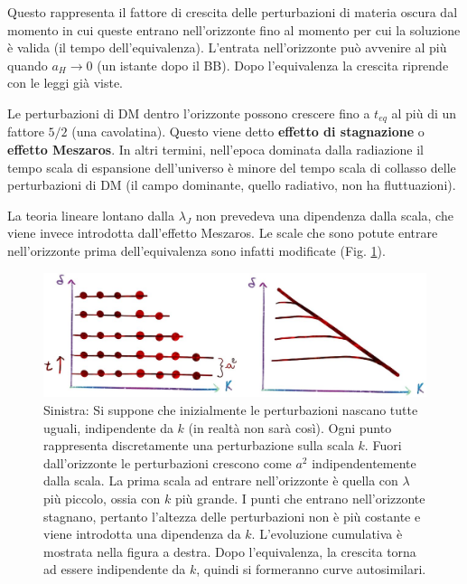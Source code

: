 Questo rappresenta il fattore di crescita delle perturbazioni di materia oscura dal momento in cui queste entrano nell'orizzonte fino al momento per cui la soluzione è valida (il tempo dell'equivalenza). L'entrata nell'orizzonte può avvenire al più quando $a_H\rightarrow 0$ (un istante dopo il BB). Dopo l'equivalenza la crescita riprende con le leggi già viste. 

\begin{definition} 
Le perturbazioni di DM dentro l'orizzonte possono crescere fino a $t_{eq}$ al più di un fattore $5/2$ (una cavolatina). Questo viene detto \textbf{effetto di stagnazione} o \textbf{effetto Meszaros}. In altri termini, nell'epoca dominata dalla radiazione il tempo scala di espansione dell'universo è minore del tempo scala di collasso delle perturbazioni di DM (il campo dominante, quello radiativo, non ha fluttuazioni).
\end{definition}

La teoria lineare lontano dalla $\lambda_J$ non prevedeva una dipendenza dalla scala, che viene invece introdotta dall'effetto Meszaros. Le scale che sono potute entrare nell'orizzonte prima dell'equivalenza sono infatti modificate (Fig. \ref{fig6:mezaros}). 


\begin{figure}[H]
    \centering
    \includegraphics[width= .93 \textwidth]{Pictures/6/meszarus.jpg}
    \caption{Sinistra: Si suppone che inizialmente le perturbazioni nascano tutte uguali, indipendente da $k$ (in realtà non sarà così). Ogni punto rappresenta discretamente una perturbazione sulla scala $k$. Fuori dall'orizzonte le perturbazioni crescono come $a^2$ indipendentemente dalla scala. La prima scala ad entrare nell'orizzonte è quella con $\lambda$ più piccolo, ossia con $k$ più grande. I punti che entrano nell'orizzonte stagnano, pertanto l'altezza delle perturbazioni non è più costante e viene introdotta una dipendenza da $k$. L'evoluzione cumulativa è mostrata nella figura a destra. Dopo l'equivalenza, la crescita torna ad essere indipendente da $k$, quindi si formeranno curve autosimilari.}\label{fig6:mezaros}
\end{figure}


